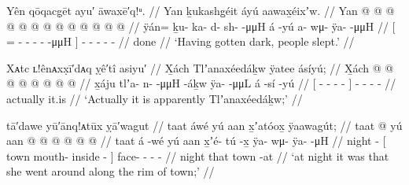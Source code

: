 
\ex\label{ex:94-7-got-dark-sleep}%
%
\begingl
	\glpreamble	Yên qōqacg̣ēt ayu′ āwaxē′q!ᵘ. //
	\glpreamble	Yan ḵukashg̱éit áyú aawax̱éixʼw. //
	\gla	{} Yan @  @ {} @ {} @ {} @ {} @ {} @ {} @ {} {}
			 @ {}
		 @ {} @ {} @ {} @ {} //
	\glb	{} ÿán= ḵu- ka- {} d- sh-  -μμH {} {}
			á -yú
		a- wμ- ÿa-  -μμH //
	\glc	{}[ = - - \· - -
			 -μμH \· {}]
			 -
		- - -  - //
	\gld	{} done  {} {} {} {} {} {} {} {}
			 {}
		 {} {} {} {} //
	\glft	‘Having gotten dark, people slept.’
		//
\endgl
\xe

\ex\label{ex:94-8-actually-wealth-woman}%
%
\begingl
	\glpreamble	Xᴀtc ʟ!ênᴀxx̣ī′dᴀq ỵê′tî asiyu′ //
	\glpreamble	X̱ách Tlʼanaxéedáḵw ÿatee ásíyú; //
	\gla	X̱ách {}  @ {} @ {} @ {} @ {} {}
		 @ {} @ {}
		 @ {} @ {} //
	\glb	x̱áju {} tlʼa- n-  -μμH -áḵw {} 
		ÿa-  -μμL
		á -sí -yú //
	\glc	{} {}[ - -  - - {}]
		-  -
		 - - //
	\gld	actually {}  {} {} {} {} {}
		 {} {}
		it.is  {} //
	\glft	‘Actually it is apparently Tlʼanaxéedáḵw;’
		//
\endgl
\xe




\ex\label{ex:94-9-night-went-town-rim}%
%
\begingl
	\glpreamble	tā′dawe yū′ānq!ᴀtūx ỵā′wagut //
	\glpreamble	taat áwé yú aan x̱ʼatóox̱ ÿaawagút; //
	\gla	taat  @ {} {} yú aan  @ {} @ {} {}
		 @ {} @ {} @ {} @ {} //
	\glb	taat á -wé {} yú aan x̱ʼé- tú -x̱ {}
		ÿa- wμ- ÿa-  -μH //
	\glc	night  - {}[  town mouth- inside - {}]
		face- - -  - //
	\gld	night  {} {} that town  {} -at {}
		 {} {} {} {} //
	\glft	‘at night it was that she went around along the rim of town;’
		//
\endgl
\xe

